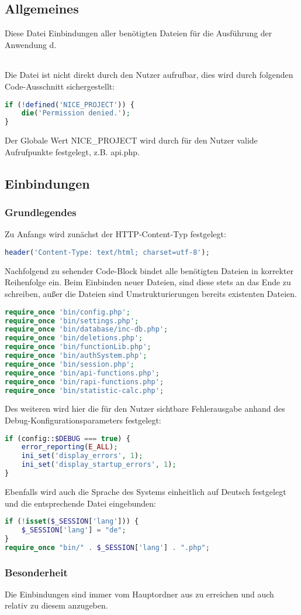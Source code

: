 \subsection{Allgemeines} Diese Datei Einbindungen aller benötigten Dateien für die Ausführung der Anwendung d.
\begin{table}[H]
	\begin{tabular}{|c|p{11cm}|}
		\hline
	\end{tabular}
\end{table}
Die Datei ist nicht direkt durch den Nutzer aufrufbar, dies wird durch folgenden Code-Ausschnitt sichergestellt:
\begin{lstlisting}[language=php]
if (!defined('NICE_PROJECT')) {
	die('Permission denied.');
}
\end{lstlisting}
Der Globale Wert {\glqq NICE\_PROJECT\grqq} wird durch für den Nutzer valide Aufrufpunkte festgelegt, z.B. {\glqq api.php\grqq}.
\newpage
\subsection{Einbindungen}
\subsubsection{Grundlegendes}
Zu Anfangs wird zunächst der HTTP-Content-Typ festgelegt:
\begin{lstlisting}[language=php]
header('Content-Type: text/html; charset=utf-8');
\end{lstlisting}
Nachfolgend zu sehender Code-Block bindet alle benötigten Dateien in korrekter Reihenfolge ein. Beim Einbinden neuer Dateien, sind diese stets an das Ende zu schreiben, außer die Dateien sind Umstrukturierungen bereits existenten Dateien.
\begin{lstlisting}[language=php]
require_once 'bin/config.php';
require_once 'bin/settings.php';
require_once 'bin/database/inc-db.php';
require_once 'bin/deletions.php';
require_once 'bin/functionLib.php';
require_once 'bin/authSystem.php';
require_once 'bin/session.php';
require_once 'bin/api-functions.php';
require_once 'bin/rapi-functions.php';
require_once 'bin/statistic-calc.php';
\end{lstlisting}
Des weiteren wird hier die für den Nutzer sichtbare Fehlerausgabe anhand des Debug-Konfigurationsparameters festgelegt:
\begin{lstlisting}[language=php]
if (config::$DEBUG === true) {
	error_reporting(E_ALL);
	ini_set('display_errors', 1);
	ini_set('display_startup_errors', 1);
}
\end{lstlisting}
Ebenfalls wird auch die Sprache des Systems einheitlich auf Deutsch festgelegt und die entsprechende Datei eingebunden:
\begin{lstlisting}[language=php]
if (!isset($_SESSION['lang'])) {
	$_SESSION['lang'] = "de";
}
require_once "bin/" . $_SESSION['lang'] . ".php";
\end{lstlisting}
\subsubsection{Besonderheit}
Die Einbindungen sind immer vom Hauptordner aus zu erreichen und auch relativ zu diesem anzugeben.